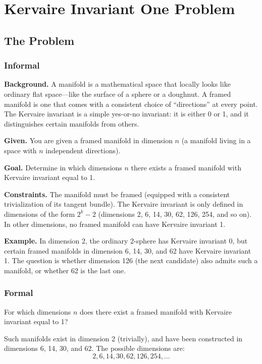 \let\LocalMacro\relax

\chapter{Kervaire Invariant One Problem}

\section{The Problem}

\subsection{Informal}

\textbf{Background.} A manifold is a mathematical space that locally looks like ordinary flat space---like the surface of a sphere or a doughnut. A framed manifold is one that comes with a consistent choice of ``directions'' at every point. The Kervaire invariant is a simple yes-or-no invariant: it is either 0 or 1, and it distinguishes certain manifolds from others.

\textbf{Given.} You are given a framed manifold in dimension $n$ (a manifold living in a space with $n$ independent directions).

\textbf{Goal.} Determine in which dimensions $n$ there exists a framed manifold with Kervaire invariant equal to 1.

\textbf{Constraints.} The manifold must be framed (equipped with a consistent trivialization of its tangent bundle). The Kervaire invariant is only defined in dimensions of the form $2^k - 2$ (dimensions 2, 6, 14, 30, 62, 126, 254, and so on). In other dimensions, no framed manifold can have Kervaire invariant 1.

\textbf{Example.} In dimension 2, the ordinary 2-sphere has Kervaire invariant 0, but certain framed manifolds in dimension 6, 14, 30, and 62 have Kervaire invariant 1. The question is whether dimension 126 (the next candidate) also admits such a manifold, or whether 62 is the last one.

\subsection{Formal}
For which dimensions $n$ does there exist a framed manifold with Kervaire invariant equal to 1?

Such manifolds exist in dimension 2 (trivially), and have been constructed in dimensions 6, 14, 30, and 62. The possible dimensions are:
\[2, 6, 14, 30, 62, 126, 254, \ldots\]

